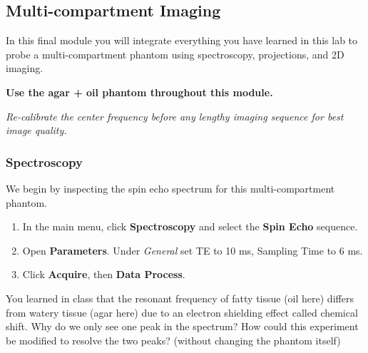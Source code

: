 \newpage
\subsection{Multi-compartment Imaging} \label{sec:multi}

In this final module you will integrate everything you have learned in this lab to probe a multi-compartment phantom using spectroscopy, projections, and 2D imaging.

\textbf{Use the agar + oil phantom throughout this module.}


\vspace{5mm}
\noindent \emph{Re-calibrate the center frequency before any lengthy imaging sequence for best image quality.}




\subsubsection{Spectroscopy}

We begin by inspecting the spin echo spectrum for this multi-compartment phantom.

\begin{enumerate}
\item	In the main menu, click \textbf{Spectroscopy} and select the \textbf{Spin Echo} sequence.
\item	Open \textbf{Parameters}. Under \emph{General} set TE to 10 ms, Sampling Time to 6 ms.
\item	Click \textbf{Acquire}, then \textbf{Data Process}.
\end{enumerate}

\color{red}
\noindent You learned in class that the resonant frequency of fatty tissue (oil here) differs from watery tissue (agar here) due to an electron shielding effect called chemical shift. Why do we only see one peak in the spectrum? How could this experiment be modified to resolve the two peaks? (without changing the phantom itself)
\color{black}

